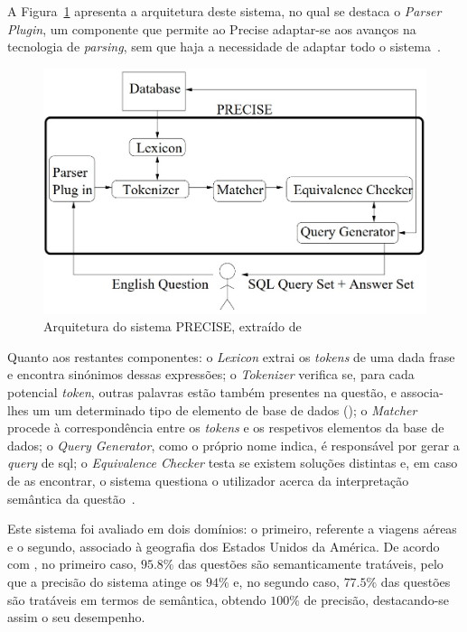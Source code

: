A Figura~\ref{fig:precise_architecture} apresenta a arquitetura deste sistema, no qual se destaca o \textit{Parser Plugin}, um componente que permite ao Precise adaptar-se aos avanços na tecnologia de \textit{parsing}, sem que haja a necessidade de adaptar todo o sistema~\parencite{modern_nlidb_composing_statistical_parsing_semantic_tractability}. 
%
\begin{figure}
    \centering
    \includegraphics[width=.8\textwidth]{ch03/assets/precise_architecture.jpg}
    \caption{Arquitetura do sistema PRECISE, extraído de~\textcite{towards_theory_nli_databases}}
    \label{fig:precise_architecture}
\end{figure}
%
Quanto aos restantes componentes: o \textit{Lexicon} extrai os \textit{tokens} de uma dada frase e encontra sinónimos dessas expressões; o \textit{Tokenizer} verifica se, para cada potencial \textit{token}, outras palavras estão também presentes na questão, e associa-lhes um um determinado tipo de elemento de base de dados (); o \textit{Matcher} procede à correspondência entre os \textit{tokens} e os respetivos elementos da base de dados; o \textit{Query Generator}, como o próprio nome indica, é responsável por gerar a \textit{query} de \gls{sql}; o \textit{Equivalence Checker} testa se existem soluções distintas e, em caso de as encontrar, o sistema questiona o utilizador acerca da interpretação semântica da questão~\parencite{towards_theory_nli_databases}.

Este sistema foi avaliado em dois domínios: o primeiro, referente a viagens aéreas e o segundo, associado à geografia dos Estados Unidos da América. De acordo com \textcite{nlidb_brief_review}, no primeiro caso, $95.8\%$ das questões são semanticamente tratáveis, pelo que a precisão do sistema atinge os $94\%$ e, no segundo caso, $77.5\%$ das questões são tratáveis em termos de semântica, obtendo $100\%$ de precisão, destacando-se assim o seu desempenho.

